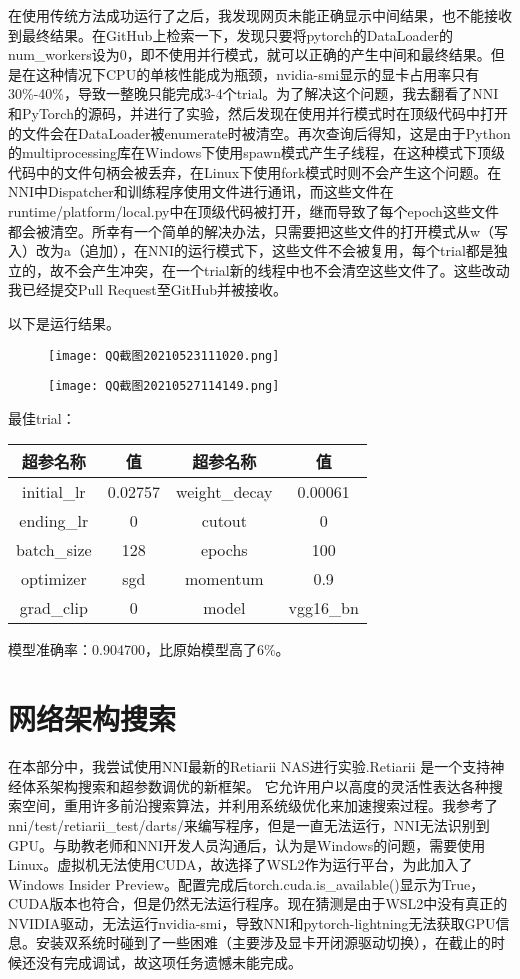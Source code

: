 \documentclass{ctexart}
\begin{document}
    在使用传统方法成功运行了之后，我发现网页未能正确显示中间结果，也不能接收到最终结果。在GitHub上检索一下，发现只要将pytorch的DataLoader的num\_workers设为0，即不使用并行模式，就可以正确的产生中间和最终结果。但是在这种情况下CPU的单核性能成为瓶颈，nvidia-smi显示的显卡占用率只有30\%-40\%，导致一整晚只能完成3-4个trial。为了解决这个问题，我去翻看了NNI和PyTorch的源码，并进行了实验，然后发现在使用并行模式时在顶级代码中打开的文件会在DataLoader被enumerate时被清空。再次查询后得知，这是由于Python的multiprocessing库在Windows下使用spawn模式产生子线程，在这种模式下顶级代码中的文件句柄会被丢弃，在Linux下使用fork模式时则不会产生这个问题。在NNI中Dispatcher和训练程序使用文件进行通讯，而这些文件在runtime/platform/local.py中在顶级代码被打开，继而导致了每个epoch这些文件都会被清空。所幸有一个简单的解决办法，只需要把这些文件的打开模式从w（写入）改为a（追加），在NNI的运行模式下，这些文件不会被复用，每个trial都是独立的，故不会产生冲突，在一个trial新的线程中也不会清空这些文件了。这些改动我已经提交Pull Request至GitHub并被接收。

    以下是运行结果。
    \begin{figure}[ht]
        \centering
        \texttt{[image: QQ截图20210523111020.png]}
    \end{figure}
    \begin{figure}[ht]
        \centering
        \texttt{[image: QQ截图20210527114149.png]}
    \end{figure}

    最佳trial：
    \begin{table}[ht]
        \centering
        \begin{tabular}{cc|cc}
            超参名称 & 值 & 超参名称 & 值\\
            \hline
            initial\_lr & 0.02757 & weight\_decay & 0.00061 \\
            ending\_lr & 0 & cutout & 0 \\
            batch\_size & 128 & epochs & 100 \\
            optimizer & sgd & momentum & 0.9 \\
            grad\_clip & 0 & model & vgg16\_bn \\
        \end{tabular}
    \end{table}
    模型准确率：0.904700，比原始模型高了6\%。
    \section{网络架构搜索}
    在本部分中，我尝试使用NNI最新的Retiarii NAS进行实验.Retiarii 是一个支持神经体系架构搜索和超参数调优的新框架。 它允许用户以高度的灵活性表达各种搜索空间，重用许多前沿搜索算法，并利用系统级优化来加速搜索过程。我参考了nni/test/retiarii\_test/darts/来编写程序，但是一直无法运行，NNI无法识别到GPU。与助教老师和NNI开发人员沟通后，认为是Windows的问题，需要使用Linux。虚拟机无法使用CUDA，故选择了WSL2作为运行平台，为此加入了Windows Insider Preview。配置完成后torch.cuda.is\_available()显示为True，CUDA版本也符合，但是仍然无法运行程序。现在猜测是由于WSL2中没有真正的NVIDIA驱动，无法运行nvidia-smi，导致NNI和pytorch-lightning无法获取GPU信息。安装双系统时碰到了一些困难（主要涉及显卡开闭源驱动切换），在截止的时候还没有完成调试，故这项任务遗憾未能完成。
\end{document}
